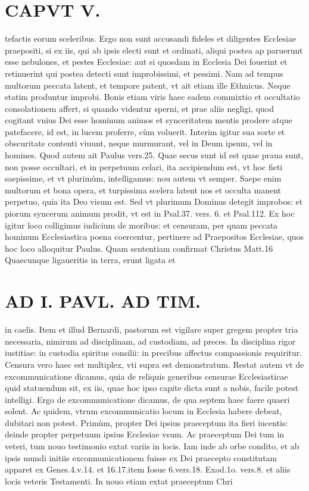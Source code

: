 \documentclass{article}
\begin{document}
\begin{pages}
\section*{CAPVT  V. }
\marginpar{[ p.387 ]}\pstart tefactis eorum sceleribus. Ergo non sunt accusandi fideles et diligentes Ecclesiae praepositi, si ex iis, qui ab ipsis electi sunt et ordinati, aliqui postea ap paruerunt esse nebulones, et pestes Ecclesiae: aut si quosdam in Ecclesia Dei fouerint et retinuerint qui postea detecti sunt improbissimi, et pessimi. Nam ad tempus multorum peccata latent, et tempore patent, vt ait etiam ille Ethnicus. Neque  statim produntur improbi. Bonis etiam viris haec eadem commixtio et occultatio consolationem affert, si quando videntur sperni, et prae aliis negligi, quod cogitant vnius Dei esse hominum animos et synceritatem mentis prodere atque  patefacere, id est, in lucem proferre, cùm voluerit. Interim igitur sua sorte et obscuritate contenti viuunt, neque murmurant, vel in Deum ipsum, vel in homines.  \pend\pstart Quod autem ait Paulus vers.25. Quae secus sunt id est quae praua sunt, non posse occultari, et in perpetuum celari, ita accipiendum est, vt hoc fieti saepissime, et vt plurimùm, intelligamus: nou autem vt semper. Saepe enim multorum et bona opera, et turpissima scelera latent nos et occulta manent perpetuo, quia ita Deo visum est. Sed vt plurimum Dominus detegit improbos: et piorum syncerum animum prodit, vt est in Psal.37. vers. 6. et Psal.112.  \pend\pstart Ex hoc igitur loco colligimus iudicium de moribus: et censuram, per quam peccata hominum Ecclesiastica poena coercentur, pertinere ad Praepositos Ecclesiae, quos hoc loco alloquitur Paulus. Quam sententiam confirmat Christus Matt.16 Quaecunque ligaueritis in terra, erunt ligata et  \pend
\section*{AD I. PAVL. AD TIM. }
\marginpar{[ p.388 ]}\pstart in caelis. Item et illud Bernardi, pastorum est vigilare super gregem propter tria necessaria, nimirum ad disciplinam, ad custodiam, ad preces. In disciplina rigor iustitiae: in custodia spiritus consilii: in precibus affectus compassionis requiritur. Censura vero haec est multiplex, vti supra est demonstratum. Restat autem vt de excommunicatione dicamus, quia de reliquis generibus censurae Ecclesiasticae quid statuendum sit, ex iis, quae hoc ipso capite dicta sunt a nobis, facile potest intelligi. Ergo de excommunicatione dicamus, de qua septem haec faere quaeri solent.  \pend\pstart Ac quidem, vtrum excommunicatio locum in Ecclesia habere debeat, dubitari non potest. Primùm, propter Dei ipsius praeceptum ita fieri iucentis: deinde propter perpetuum ipsius Ecclesiae vsum. Ac praeceptum Dei tum in veteri, tum nouo testimonio extat variis in locis. Iam inde ab orbe condito, et ab ipsis mundi initiis exconmunicationem fuisse ex Dei praecepto constitutam apparet ex Genes.4.v.14. et 16.17.item Iosue 6.vers.18. Exod.1o. vers.8. et aliis locis veteris Testamenti. In nouo etiam extat praeceptum Chri\pend

\end{pages}
\end{document}
